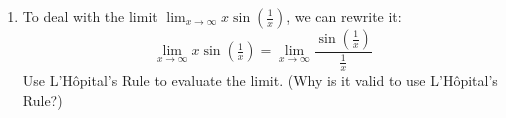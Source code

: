 \documentclass{article}
\begin{document}
\begin{enumerate}
\begin{enumerate}




  \item
\begin{problem}[\vfill]
      To deal with the limit $\displaystyle \lim_{x \to \infty}
      x\sin(\tfrac{1}{x})$, we can rewrite it:
      \[ \lim_{x \to \infty} x\sin(\tfrac{1}{x}) = \lim_{x \to \infty} \frac{\sin(\tfrac{1}{x})}{\tfrac{1}{x}}\]  Use L'Hôpital's Rule to evaluate the limit.  (Why is it valid to use L'Hôpital's
      Rule?) 
    \end{problem}


\end{enumerate}
\end{enumerate}
\end{document}
